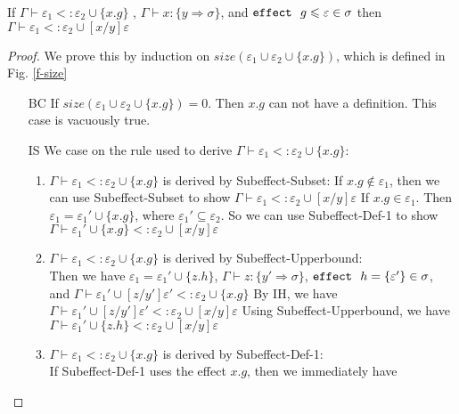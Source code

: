 \sloppy
\begin{lemma} \label{lemma-reverse1}
If $\Gamma \vdash \varepsilon_1 <: \varepsilon_2 \cup \{x.g\}$
, $\Gamma \vdash x : \{y \Rightarrow \sigma\}$, and
$\mathtt{effect}~\ g \leqslant \varepsilon \in \sigma$
then 
$\Gamma \vdash \varepsilon_1 <: \varepsilon_2 \cup [x/y]\varepsilon$
\end{lemma}
\begin{proof}
We prove this by induction on $size(\varepsilon_1 \cup \varepsilon_2 \cup \{x.g\})$, which is defined in Fig. \ref{f-size}
\begin{enumerate}
    \item[BC] If $size(\varepsilon_1 \cup \varepsilon_2 \cup \{x.g\}) = 0$. Then $x.g$ can not have a definition. This case is vacuously true.
    \item[IS] We case on the rule used to derive  $\Gamma \vdash \varepsilon_1  <: \varepsilon_2 \cup \{x.g\}$:
    \begin{enumerate}
        \item  $\Gamma \vdash \varepsilon_1  <: \varepsilon_2 \cup \{x.g\}$ is derived by Subeffect-Subset: If $x.g \not\in \varepsilon_1$, then we can use Subeffect-Subset to show 
        $\Gamma \vdash \varepsilon_1  <: \varepsilon_2 \cup [x/y]\varepsilon$
        If $x.g \in \varepsilon_1$. Then $\varepsilon_1 = \varepsilon_1' \cup \{x.g\}$, where $\varepsilon_1' \subseteq \varepsilon_2$. So we can use Subeffect-Def-1 to show
        $\Gamma \vdash \varepsilon_1' \cup \{x.g\}  <: \varepsilon_2 \cup [x/y]\varepsilon$
        \item $\Gamma \vdash \varepsilon_1  <: \varepsilon_2 \cup \{x.g\}$ is derived by Subeffect-Upperbound:\\
        Then we have 
        $\varepsilon_1 = \varepsilon_1' \cup \{z.h\}$,
        $\Gamma \vdash z : \{y' \Rightarrow\sigma\}$, 
        $\mathtt{effect}~\ h = \{ \varepsilon'\} \in \sigma$,
        and 
        \mbox{$\Gamma \vdash \varepsilon_1' \cup [z/y']\varepsilon' <: \varepsilon_2 \cup \{x.g\}$}
        By IH, we have 
        $\Gamma \vdash \varepsilon_1' \cup [z/y']\varepsilon' <: \varepsilon_2 \cup [x/y]\varepsilon$
        Using Subeffect-Upperbound, we have 
        $\Gamma \vdash \varepsilon_1' \cup \{z.h\} <: \varepsilon_2 \cup [x/y]\varepsilon$
        \item $\Gamma \vdash \varepsilon_1  <: \varepsilon_2 \cup \{x.g\}$ is derived by Subeffect-Def-1:\\
        If Subeffect-Def-1 uses the effect ${x.g}$, then we immediately have

\end{enumerate}
\end{enumerate}
\end{proof}

